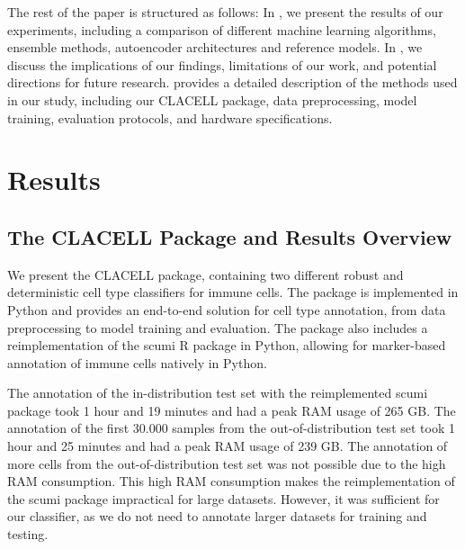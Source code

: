 \documentclass[11pt]{article}
\begin{document}
The rest of the paper is structured as follows: In , we present the results of our experiments, including a comparison of different machine learning algorithms, ensemble methods, autoencoder architectures and reference models. In , we discuss the implications of our findings, limitations of our work, and potential directions for future research.  provides a detailed description of the methods used in our study, including our CLACELL package, data preprocessing, model training, evaluation protocols, and hardware specifications.



\section{Results}\label{sec:results}

\subsection{The CLACELL Package and Results Overview}\label{sec:results:overview}



We present the CLACELL package, containing two different robust and deterministic cell type classifiers for immune cells. The package is implemented in Python and provides an end-to-end solution for cell type annotation, from data preprocessing to model training and evaluation. The package also includes a reimplementation of the scumi R package in Python, allowing for marker-based annotation of immune cells natively in Python.

The annotation of the in-distribution test set with the reimplemented scumi package took 1 hour and 19 minutes and had a peak RAM usage of 265 GB. The annotation of the first 30.000 samples from the out-of-distribution test set took 1 hour and 25 minutes and had a peak RAM usage of 239 GB. The annotation of more cells from the out-of-distribution test set was not possible due to the high RAM consumption. This high RAM consumption makes the reimplementation of the scumi package impractical for large datasets. However, it was sufficient for our classifier, as we do not need to annotate larger datasets for training and testing.
\end{document}
